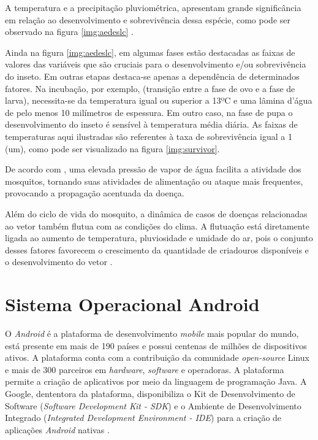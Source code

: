 A temperatura e a precipitação pluviométrica, apresentam grande significância em relação ao desenvolvimento e sobrevivência dessa espécie, como pode ser observado na figura \ref{img:aedeslc} \cite{hopp2001global, ribeiro2006associaccao}. 

Ainda na figura \ref{img:aedeslc}, em algumas fases estão destacadas as faixas de valores das variáveis que são cruciais para o desenvolvimento e/ou sobrevivência do inseto. Em outras etapas destaca-se apenas a dependência de determinados fatores. Na incubação, por exemplo, (transição entre a fase de ovo e a fase de larva), necessita-se da temperatura igual ou superior a 13ºC e uma lâmina d’água de pelo menos 10 milímetros de espessura. Em outro caso, na fase de pupa o desenvolvimento do inseto é sensível à temperatura média diária. As faixas de temperaturas aqui ilustradas são referentes à taxa de sobrevivência igual a 1 (um), como pode ser visualizado na figura \ref{img:survivor}.


 

De acordo com , uma elevada pressão de vapor de água facilita a atividade dos mosquitos, tornando suas atividades de alimentação ou ataque mais frequentes, provocando a propagação acentuada da doença.

Além do ciclo de vida do mosquito, a dinâmica de casos de doenças relacionadas ao vetor também flutua com as condições do clima. A flutuação está diretamente ligada ao aumento de temperatura, pluviosidade e umidade do ar, pois o conjunto desses fatores favorecem o crescimento da quantidade de criadouros disponíveis e o desenvolvimento do vetor \cite{ribeiro2006associaccao}.

\section{Sistema Operacional Android}

O \textit{Android} é a plataforma de desenvolvimento \textit{mobile} mais popular do mundo, está presente em mais de 190 países e possui centenas de milhões de dispositivos ativos. A plataforma conta com a contribuição da comunidade \textit{open-source} Linux e mais de 300 parceiros em \textit{hardware}, \textit{software} e operadoras. A plataforma permite a criação de aplicativos por meio da linguagem de programação Java. A Google, dententora da plataforma, disponibiliza o Kit de Desenvolvimento de Software (\textit{Software Development Kit - SDK}) e o Ambiente de Desenvolvimento Integrado (\textit{Integrated Development Environment - IDE}) para a criação de aplicações \textit{Android} nativas \cite{SITEANDROID}.


